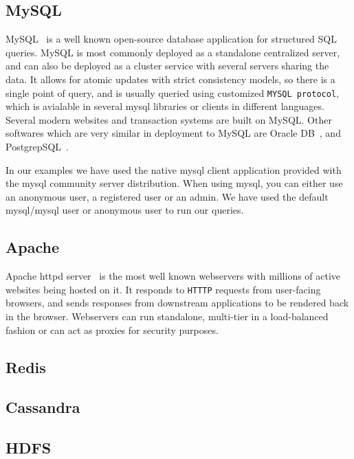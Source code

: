 \subsection{MySQL}

MySQL~\cite{mysql} is a well known open-source database application for structured SQL queries. 
MySQL is most commonly deployed as a standalone centralized server, and can also be deployed as a cluster service with several servers sharing the data. 
It allows for atomic updates with strict consistency models, so there is a single point of query, and is usually queried using customized \texttt{MYSQL protocol}, which is avialable in several mysql libraries or clients in different languages.
Several modern websites and transaction systems are built on MySQL.
Other softwares which are very similar in deployment to MySQL are Oracle DB~\cite{oracle}, and PostgrepSQL~\cite{postgresql}.

In our examples we have used the native mysql client application provided with the mysql community server distribution.
When using mysql, you can either use an anonymous user, a registered user or an admin.
We have used the default mysql/mysql user or anonymous user to run our queries.

\subsection{Apache}

Apache httpd server~\cite{apache} is the most well known webservers with millions of active websites being hosted on it.
It responds to \texttt{HTTTP} requests from user-facing browsers, and sends responses from downstream applications to be rendered back in the browser.
Webservers can run standalone, multi-tier in a load-balanced fashion or can act as proxies for security purposes.


\subsection{Redis}

\subsection{Cassandra}

\subsection{HDFS}

